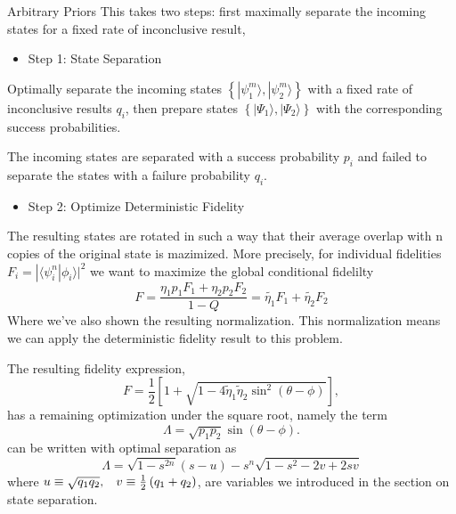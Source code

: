\documentclass{beamer}
\newcommand{\ke}[1]{|#1\rangle}
\newcommand{\bk}[2]{\langle #1|#2\rangle}
\begin{document}
\begin{frame}{Arbitrary Priors}
This takes two steps: first maximally separate the incoming states for a fixed rate of inconclusive result, 
\begin{itemize}
\item Step 1: State Separation
\end{itemize}
Optimally separate the incoming states $\left\{ \ke{\psi_{1}^{m}},\ke{\psi_{2}^{m}}\right\} $
with a fixed rate of inconclusive results $q_{i}$, then prepare states
$\left\{ \ke{\Psi_{1}},\ke{\Psi_{2}}\right\} $ with the
corresponding success probabilities. 

The incoming states are separated with a success probability $p_{i}$
and failed to separate the states with a failure probability $q_{i}$.
\end{frame}
\begin{frame}
\begin{itemize}
\item Step 2: Optimize Deterministic Fidelity
\end{itemize}
The resulting states are rotated in such a way that their average overlap with n copies of the original state is mazimized. 
More precisely, for individual fidelities $F_i = |\bk{\psi_i^n}{\phi_i}|^2$ we want to maximize the global conditional fidelilty 
\[F = \frac{\eta_1 p_1 F_1 + \eta_2 p_2 F_2}{1-Q} = \tilde{\eta_1} F_1 + \tilde{\eta_2} F_2\]
Where we've also shown the resulting normalization.  This normalization means we can apply the deterministic fidelity result to this problem.
\end{frame}
\begin{frame}
The resulting fidelity expression,
\[F  = \frac{1}{2}\left[1+\sqrt{1-4\tilde{\eta}_{1}\tilde{\eta}_{2}\sin^{2}\left(\theta-\phi\right)}\right],\]
  has a remaining optimization under the square root, namely the term
\begin{equation*}
\Lambda =  \sqrt{p_{1}p_{2}}\sin\left(\theta-\phi \right).
\end{equation*}
can be written with optimal separation as
\begin{equation*}
\Lambda = \sqrt{1-s^{2n}}\left(s-u\right)-s^{n}\sqrt{1-s^{2}-2v+2sv}
\end{equation*}
where $u\equiv\sqrt{q_{1}q_{2}},\hspace{0.3cm}v\equiv\frac{1}{2}\left(q_{1}+q_{2}\right)$, 
are variables we introduced in the section on state separation.
\end{frame}
\end{document}

